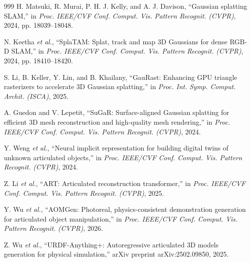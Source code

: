 \documentclass[12pt,a4paper,oneside]{report}
\begin{document}
\begin{thebibliography}{999}
H. Matsuki, R. Murai, P. H. J. Kelly, and A. J. Davison, ``Gaussian splatting {SLAM},'' in \textit{Proc. IEEE/CVF Conf. Comput. Vis. Pattern Recognit. (CVPR)}, 2024, pp. 18039--18048.




N. Keetha \textit{et al.}, ``{SplaTAM}: Splat, track and map {3D} Gaussians for dense {RGB-D SLAM},'' in \textit{Proc. IEEE/CVF Conf. Comput. Vis. Pattern Recognit. (CVPR)}, 2024, pp. 18410--18420.




S. Li, B. Keller, Y. Lin, and B. Khailany, ``{GauRast}: Enhancing {GPU} triangle rasterizers to accelerate {3D} Gaussian splatting,'' in \textit{Proc. Int. Symp. Comput. Archit. (ISCA)}, 2025.




A. Guedon and V. Lepetit, ``{SuGaR}: Surface-aligned {Gaussian} splatting for efficient {3D} mesh reconstruction and high-quality mesh rendering,'' in \textit{Proc. IEEE/CVF Conf. Comput. Vis. Pattern Recognit. (CVPR)}, 2024.





Y. Weng \textit{et al.}, ``Neural implicit representation for building digital twins of unknown articulated objects,'' in \textit{Proc. IEEE/CVF Conf. Comput. Vis. Pattern Recognit. (CVPR)}, 2024.




Z. Li \textit{et al.}, ``{ART}: Articulated reconstruction transformer,'' in \textit{Proc. IEEE/CVF Conf. Comput. Vis. Pattern Recognit. (CVPR)}, 2025.




Y. Wu \textit{et al.}, ``{AOMGen}: Photoreal, physics-consistent demonstration generation for articulated object manipulation,'' in \textit{Proc. IEEE/CVF Conf. Comput. Vis. Pattern Recognit. (CVPR)}, 2026.




Z. Wu \textit{et al.}, ``{URDF-Anything+}: Autoregressive articulated {3D} models generation for physical simulation,'' arXiv preprint arXiv:2502.09850, 2025.




\end{thebibliography}
\end{document}

